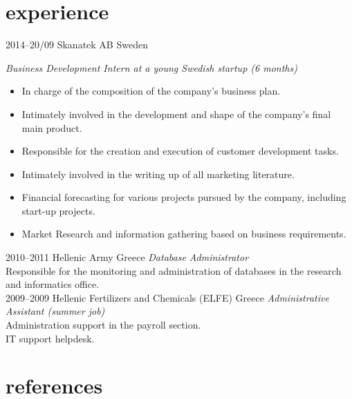 \documentclass[]{thanos-cv}
\begin{document}

\section{experience}

\begin{entrylist}
\entry
{2014--20/09}
{Skanatek AB}
{Sweden}
{\emph{Business Development Intern at a young Swedish startup (6 months)} 
\begin{itemize}[leftmargin=*]
\item In charge of the composition of the company's business plan.
\item Intimately involved in the development and shape of the company's final main product.
\item Responsible for the creation and execution of customer development tasks.
\item Intimately involved in the writing up of all marketing literature.
\item Financial forecasting for various projects pursued by the company, including start-up projects.
\item Market Research and information gathering based on business requirements.
\end{itemize}
}
\entry
{2010--2011}
{Hellenic Army}
{Greece}
{\emph{Database Administrator} \\
Responsible for the monitoring and administration of databases in the research and informatics office.\\
}
\entry
{2009--2009}
{Hellenic Fertilizers and Chemicals (ELFE)}
{Greece}
{\emph{Administrative Assistant (summer job)} \\
Administration support in the payroll section.\\
IT support helpdesk.
}
\end{entrylist}



\section{references}
\end{document}
